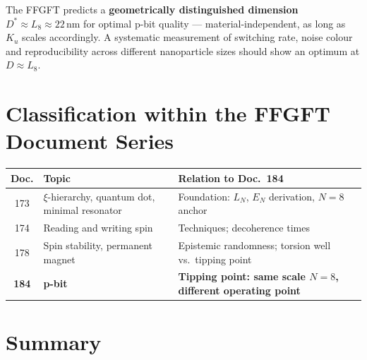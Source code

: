 	\begin{keypoint}
		The FFGFT predicts a \textbf{geometrically distinguished dimension}
		$D^* \approx L_8 \approx 22\,\text{nm}$ for optimal p-bit quality
		--- material-independent, as long as $K_u$ scales accordingly.
		A systematic measurement of switching rate, noise colour and
		reproducibility across different nanoparticle sizes should
		show an optimum at $D \approx L_8$.
	\end{keypoint}
	
	\section{Classification within the FFGFT Document Series}
	\label{sec:classification}
	
	\begin{center}
	{\footnotesize
	\begin{tabularx}{\textwidth}{clX}
		\toprule
		\textbf{Doc.} & \textbf{Topic} & \textbf{Relation to Doc.~184} \\
			\midrule
			173 & $\xi$-hierarchy, quantum dot, minimal resonator &
			Foundation: $L_N$, $E_N$ derivation, $N=8$ anchor \\
			174 & Reading and writing spin &
			Techniques; decoherence times \\
			178 & Spin stability, permanent magnet &
			Epistemic randomness; torsion well vs.\ tipping point \\
		\textbf{184} & \textbf{p-bit} &
		\textbf{Tipping point: same scale $N=8$, different operating point} \\
		\bottomrule
	\end{tabularx}
	} %
\end{center}
	
	\section{Summary}
	\label{sec:summary}
	
